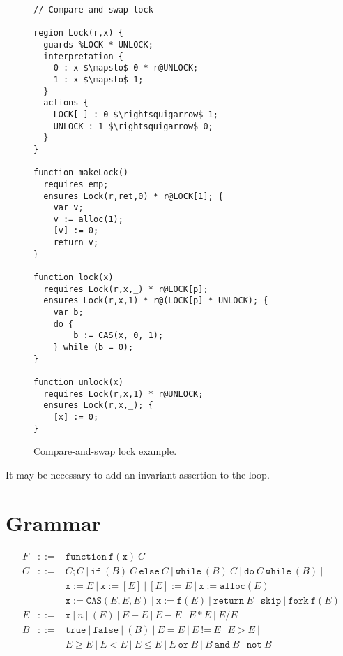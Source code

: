 \documentclass[a4paper]{article}
\newcommand{\pfunction}[3]{\mathtt{function} \ #1(#2) \ #3}
\newcommand{\psequence}[2]{#1 ; #2}
\newcommand{\pifelse}[3]{\mathtt{if} \ (#1) \ #2 \ \mathtt{else} \ #3}
\newcommand{\pwhile}[2]{\mathtt{while} \ (#1) \ #2}
\newcommand{\pdowhile}[2]{\mathtt{do} \ #1 \ \mathtt{while} \ (#2)}
\newcommand{\plassign}[2]{#1 := #2}
\newcommand{\passign}[2]{[#1] := #2}
\newcommand{\pderef}[2]{#1 := [#2]}
\newcommand{\pfuncall}[3]{#1 := #2(#3)}
\newcommand{\pcas}[4]{#1 := \mathtt{CAS}(#2, #3, #4)}
\newcommand{\palloc}[2]{#1 := \mathtt{alloc}(#2)}
\newcommand{\preturn}[1]{\mathtt{return} \ #1}
\newcommand{\pskip}[0]{\mathtt{skip}}
\newcommand{\pfork}[2]{\mathtt{fork} \ #1(#2)}
\begin{document}
\begin{figure}
\begin{center}
\begin{lstlisting}[language=caper,mathescape,columns=flexible]
// Compare-and-swap lock

region Lock(r,x) {
  guards %LOCK * UNLOCK;
  interpretation {
    0 : x $\mapsto$ 0 * r@UNLOCK;
    1 : x $\mapsto$ 1;
  }
  actions {
    LOCK[_] : 0 $\rightsquigarrow$ 1;
    UNLOCK : 1 $\rightsquigarrow$ 0;
  }
}

function makeLock()
  requires emp;
  ensures Lock(r,ret,0) * r@LOCK[1]; {
    var v;
    v := alloc(1);
    [v] := 0;
    return v;
}

function lock(x)
  requires Lock(r,x,_) * r@LOCK[p];
  ensures Lock(r,x,1) * r@(LOCK[p] * UNLOCK); {
    var b;
    do {
        b := CAS(x, 0, 1);
    } while (b = 0);
}

function unlock(x)
  requires Lock(r,x,1) * r@UNLOCK;
  ensures Lock(r,x,_); {
    [x] := 0;
}
\end{lstlisting}
\end{center}
\caption{Compare-and-swap lock example.}
\label{fig:caslock}
\end{figure}

It may be necessary to add an invariant assertion to the loop.

\section{Grammar}

\[
\begin{array}{rcl}
  F & ::= & \pfunction{\mathtt{f}}{\mathtt{x}}{C} \\
  C & ::= & \psequence{C}{C} \ | \ \pifelse{B}{C}{C} \ | \ \pwhile{B}{C} \ | \ \pdowhile{C}{B} \ | \ \\
  & & \plassign{\mathtt{x}}{E} \ | \ \pderef{\mathtt{x}}{E} \ | \ \passign{E}{E} \ | \ \palloc{\mathtt{x}}{E} \ | \ \\
  & & \pcas{\mathtt{x}}{E}{E}{E} \ | \ \pfuncall{\mathtt{x}}{\mathtt{f}}{E} \ | \ \preturn{E} \ | \ \pskip \ | \ \pfork{\mathtt{f}}{E} \\
  E & ::= & \mathtt{x} \ | \ n \ | \ ( E ) \ | \ E + E \ | \ E - E \ | \ E * E \ | \ E / E\\
  B & ::= & \mathtt{true} \ | \ \mathtt{false} \ | \ ( B ) \ | \ E = E \ | \ E \ \text{!=} \ E \ | \ E > E \ | \ \\
  & & E \ge E \ | \ E < E \ | \ E \le E \ | \ E \ \mathtt{or} \ B \ | \ B \ \mathtt{and} \ B \ | \ \mathtt{not} \ B
\end{array}
\]
\end{document}
